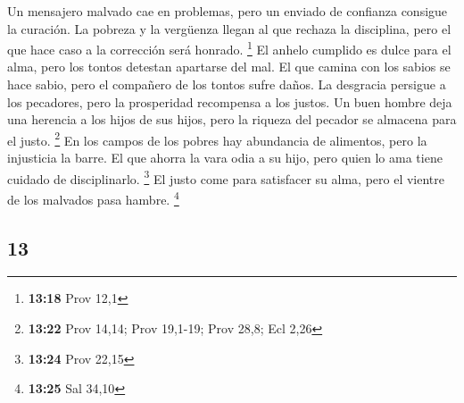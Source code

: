 \begin{paracol}{2}
Un mensajero malvado cae en problemas, pero un enviado de confianza
consigue la curación.  La pobreza y la vergüenza llegan
al que rechaza la disciplina, pero el que hace caso a la corrección será
honrado. \footnote{\textbf{13:18} Prov 12,1}  El anhelo
cumplido es dulce para el alma, pero los tontos detestan apartarse del
mal.  El que camina con los sabios se hace sabio, pero el
compañero de los tontos sufre daños.  La desgracia
persigue a los pecadores, pero la prosperidad recompensa a los justos.
 Un buen hombre deja una herencia a los hijos de sus
hijos, pero la riqueza del pecador se almacena para el justo.
\footnote{\textbf{13:22} Prov 14,14; Prov 19,1-19; Prov 28,8; Ecl 2,26}
 En los campos de los pobres hay abundancia de alimentos,
pero la injusticia la barre.  El que ahorra la vara odia
a su hijo, pero quien lo ama tiene cuidado de disciplinarlo. \footnote{\textbf{13:24}
  Prov 22,15}  El justo come para satisfacer su alma,
pero el vientre de los malvados pasa hambre. \footnote{\textbf{13:25}
  Sal 34,10}

\switchcolumn
\begin{otherlanguage}{english}

\hypertarget{section-25}{%
\section{13}\label{section-25}}


\end{otherlanguage}
\end{paracol}

